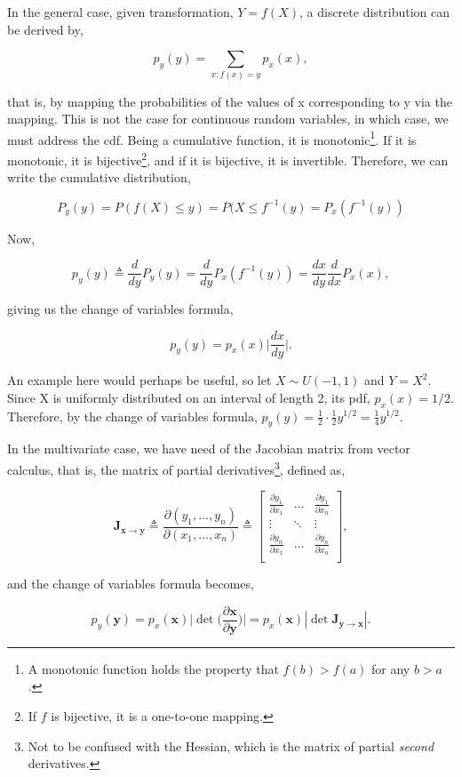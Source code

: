 \documentclass[11pt]{amsart}
\begin{document}
In the general case, given transformation, $Y = f(X)$, a discrete distribution can be derived by,

$$p_y(y) = \sum_{x:f(x)=y} p_x(x),$$

that is, by mapping the probabilities of the values of x corresponding to y via the mapping. This is not the case for continuous random variables, in which case, we must address the cdf. Being a cumulative function, it is monotonic\footnote{A monotonic function holds the property that $f(b) > f(a)$ for any $b > a$.}. If it is monotonic, it is bijective\footnote{If $f$ is bijective, it is a one-to-one mapping.}, and if it is bijective, it is invertible. Therefore, we can write the cumulative distribution,

$$P_y(y) = P(f(X) \leq y) = P(X \leq f^{-1}(y) = P_x(f^{-1}(y))$$

Now,

$$
p_y(y) \triangleq \frac{d}{dy}P_y(y) = \frac{d}{dy}P_x(f^{-1}(y)) = \frac{dx}{dy}\frac{d}{dx}P_x(x),
$$

giving us the change of variables formula,

$$p_y(y) = p_x(x)\Big|\frac{dx}{dy}\Big|.$$

An example here would perhaps be useful, so let $X \sim U(-1, 1)$ and $Y = X^2$. Since X is uniformly distributed on an interval of length 2, its pdf, $p_x(x) = 1/2$. Therefore, by the change of variables formula, $p_y(y) = \frac{1}{2} \cdot \frac{1}{2}y^{1/2} = \frac{1}{4}y^{1/2}$.

In the multivariate case, we have need of the Jacobian matrix from vector calculus, that is, the matrix of partial derivatives\footnote{Not to be confused with the Hessian, which is the matrix of partial \emph{second} derivatives.}, defined as,

$$\mathbf{J}_{\mathbf{x} \to \mathbf{y}} \triangleq \frac{\partial(y_1, \dots, y_n)}{\partial(x_1, \dots, x_n)} \triangleq 
\begin{bmatrix}
\frac{\partial y_1}{\partial x_1} & \dots & \frac{\partial y_1}{\partial x_n} \\
\vdots & \ddots & \vdots \\
\frac{\partial y_n}{\partial x_1} & \dots & \frac{\partial y_n}{\partial x_n} \\
\end{bmatrix},
$$

and the change of variables formula becomes,

$$p_y(\mathbf{y}) = p_x(\mathbf{x})\big|\det \Bigg(\frac{\partial\mathbf{x}}{\partial\mathbf{y}}\Bigg)\big| = p_x(\mathbf{x})|\det \mathbf{J}_{\mathbf{y} \to \mathbf{x}}|.$$
\end{document}
